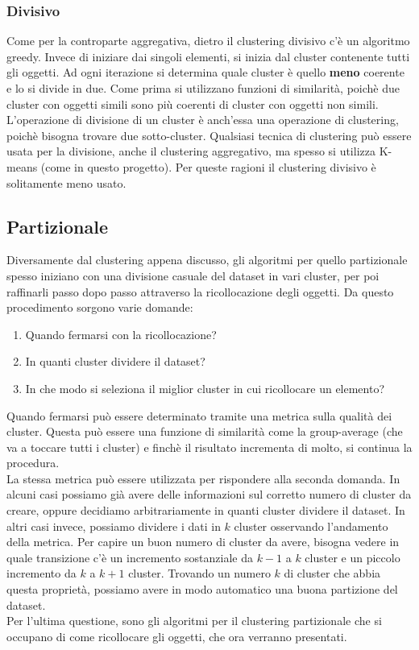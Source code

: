 \documentclass{llncs}
\newcommand{\acapo}{\vspace{0.5\baselineskip}\\}
\begin{document}
	\subsubsection{Divisivo}
	Come per la controparte aggregativa, dietro il clustering divisivo c'è un algoritmo greedy. Invece di iniziare dai singoli elementi, si inizia dal cluster contenente tutti gli oggetti. Ad ogni iterazione
	si determina quale cluster è quello \textbf{meno} coerente e lo si divide in due. Come prima si utilizzano funzioni di similarità, poichè due cluster con oggetti simili sono più coerenti
	di cluster con oggetti non simili. L'operazione di divisione di un cluster è anch'essa una operazione di clustering, poichè bisogna trovare
	due sotto-cluster. Qualsiasi tecnica di clustering può essere usata per la divisione, anche il clustering aggregativo, ma spesso si utilizza K-means (come in questo progetto).
	Per queste ragioni il clustering divisivo è solitamente meno usato.
	
	\subsection{Partizionale}
	Diversamente dal clustering appena discusso, gli algoritmi per quello partizionale spesso
	iniziano con una divisione casuale del dataset in vari cluster, per poi raffinarli passo dopo passo attraverso 
	la ricollocazione degli oggetti. Da questo procedimento sorgono varie domande: 
	\begin{enumerate}
		\item Quando fermarsi con la ricollocazione?
		\item In quanti cluster dividere il dataset?
		\item In che modo si seleziona il miglior cluster in cui ricollocare un elemento?
	\end{enumerate} 
	Quando fermarsi può essere determinato tramite una metrica sulla qualità dei cluster. Questa può essere una funzione 
	di similarità come la group-average (che va a toccare tutti i cluster) e finchè il risultato incrementa di molto, si continua la procedura.
	\acapo
	La stessa metrica può essere utilizzata per rispondere alla seconda domanda. In alcuni casi possiamo già avere
	delle informazioni sul corretto numero di cluster da creare, oppure decidiamo arbitrariamente in quanti cluster dividere il dataset.
	In altri casi invece, possiamo dividere i dati in $k$ cluster osservando l'andamento della metrica.
	Per capire un buon numero di cluster da avere, bisogna vedere in quale transizione c'è un 
	incremento sostanziale da $k-1$ a $k$ cluster e un piccolo incremento da $k$ a $k+1$ cluster.
	Trovando un numero $k$ di cluster che abbia questa proprietà, possiamo avere in modo automatico una buona partizione del dataset.
	\acapo
	Per l'ultima questione, sono gli algoritmi per il clustering partizionale che si occupano di come ricollocare gli oggetti, che ora verranno 
	presentati.
\end{document}
